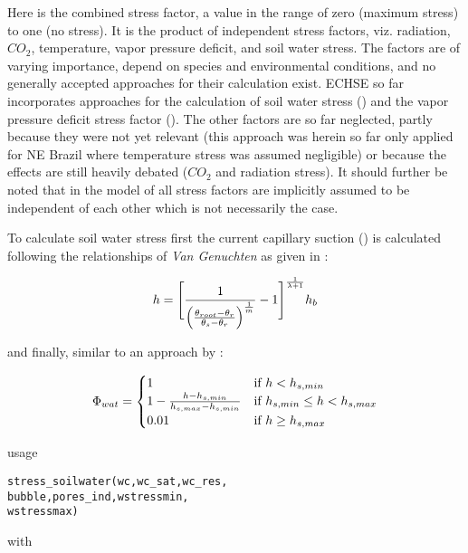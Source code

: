 Here \condStress{} is the combined stress factor, a value in the range of zero (maximum stress) to one (no stress). It is the product of independent stress factors, viz. radiation, $CO_2$, temperature, vapor pressure deficit, and soil water stress. The factors are of varying importance, depend on species and environmental conditions, and no generally accepted approaches for their calculation exist. ECHSE so far incorporates approaches for the calculation of soil water stress (\condSoilWat{}) and the vapor pressure deficit stress factor (\condVapPress{}). The other factors are so far neglected, partly because they were not yet relevant (this approach was herein so far only applied for NE Brazil where temperature stress was assumed negligible) or because the effects are still heavily debated ($CO_2$ and radiation stress). It should further be noted that in the model of \citet{Jarvis1976} all stress factors are implicitly assumed to be independent of each other which is not necessarily the case.

To calculate soil water stress first the current capillary suction (\capilSuc{}) is calculated following the relationships of \emph{Van Genuchten} as given in \citet{Maidment1993}:

\begin{equation} \label{eqn:et:res:stress_suc}
h = \Biggl[ \frac{1}{\Bigl( \frac{\theta_{root} - \theta_r}{\theta_s - \theta_r} \Bigr)^{\frac{1}{m}}} - 1 \Biggr]^{\frac{1}{\lambda + 1}} h_b
\end{equation}

\noindent
and finally, similar to an approach by \citet{Hanan1997}:

\begin{equation} \label{eqn:et:res:stress_wat}
\Phi_{wat} = 
\begin{cases}
1 & \mbox{if } h < h_{s,min} \\
1 - \frac{h - h_{s,min}}{h_{s,max} - h_{s,min}} & \mbox{if } h_{s,min} \leq h < h_{s,max} \\
0.01 & \mbox{if } h \geq h_{s,max}
\end{cases}
\end{equation}

\noindent
usage
\begin{verbatim}
stress_soilwater(wc,wc_sat,wc_res,
bubble,pores_ind,wstressmin,
wstressmax)
\end{verbatim}

\noindent
with\\ \vspace*{2ex}

